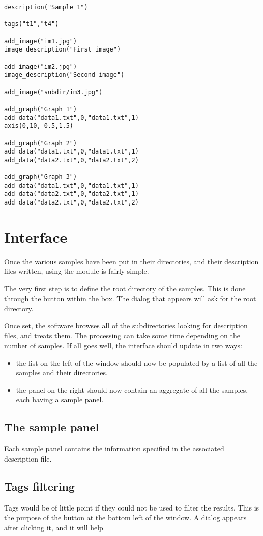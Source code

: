 \begin{lstlisting}
description("Sample 1")

tags("t1","t4")

add_image("im1.jpg")
image_description("First image")

add_image("im2.jpg")
image_description("Second image")

add_image("subdir/im3.jpg")

add_graph("Graph 1")
add_data("data1.txt",0,"data1.txt",1)
axis(0,10,-0.5,1.5)

add_graph("Graph 2")
add_data("data1.txt",0,"data1.txt",1)
add_data("data2.txt",0,"data2.txt",2)

add_graph("Graph 3")
add_data("data1.txt",0,"data1.txt",1)
add_data("data2.txt",0,"data2.txt",1)
add_data("data2.txt",0,"data2.txt",2)
\end{lstlisting}

\section{Interface}

Once the various samples have been put in their directories, and their description files written, using the module is fairly simple.

The very first step is to define the root directory of the samples. This is done through the  button within the  box. The dialog that appears will ask for the root directory.

Once set, the software browses all of the subdirectories looking for description files, and treats them. The processing can take some time depending on the number of samples. If all goes well, the interface should update in two ways:
\begin{itemize}
	\item the list on the left of the window should now be populated by a list of all the samples and their directories.
	\item the panel on the right should now contain an aggregate of all the samples, each having a sample panel.
\end{itemize}

\subsection{The sample panel}

Each sample panel contains the information specified in the associated description file. 

\subsection{Tags filtering}

\label{samples_explorer_tags}
Tags would be of little point if they could not be used to filter the results. This is the purpose of the  button at the bottom left of the window. A dialog appears after clicking it, and it will help 
